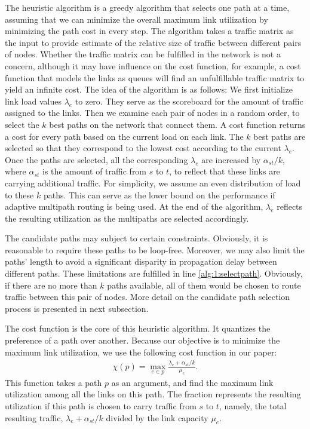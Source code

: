 \documentclass[conference]{IEEEtran}
\begin{document}
The heuristic algorithm is a greedy algorithm that selects one path at a time,
assuming that we can minimize the overall maximum link utilization by
minimizing the path cost in every step. The algorithm takes a traffic matrix as
the input to provide estimate of the relative size of traffic between different
pairs of nodes. Whether the traffic matrix can be fulfilled in the network is
not a concern, although it may have influence on the cost function, for example, a
cost function that models the links as queues will find an unfulfillable
traffic matrix to yield an infinite cost. The idea of the algorithm is as
follows: We first initialize link load values $\lambda_e$ to zero. They serve
as the scoreboard for the amount of traffic assigned to the links. Then we
examine each pair of nodes in a random order, to select the $k$ best paths on
the network that connect them. A cost function returns a cost for every path
based on the current load on each link. The $k$ best paths are selected so that
they correspond to the lowest cost according to the current $\lambda_e$. Once
the paths are selected, all the corresponding $\lambda_e$ are increased by
$\alpha_{st}/k$, where $\alpha_{st}$ is the amount of traffic from $s$ to $t$,
to reflect that these links are carrying additional traffic. For simplicity, we
assume an even distribution of load to these $k$ paths. This can serve as the
lower bound on the performance if adaptive multipath routing is being used. At
the end of the algorithm, $\lambda_e$ reflects the resulting utilization as the
multipaths are selected accordingly.

The candidate paths may subject to certain constraints. Obviously, it is
reasonable to require these paths to be loop-free. Moreover, we may also limit
the paths' length to avoid a significant disparity in propagation delay between
different paths. These limitations are fulfilled in line
\ref{alg:1:selectpath}. Obviously, if there are no more than $k$ paths
available, all of them would be chosen to route traffic between this pair of
nodes. More detail on the candidate path selection process is presented in next
subsection.

The cost function is the core of this heuristic algorithm. It quantizes the
preference of a path over another. Because our objective is to minimize the
maximum link utilization, we use the following cost function in our paper:
\begin{align}
\chi(p) = \max_{e\in p} \frac{\lambda_e + \alpha_{st}/k}{\mu_e}.
\label{maxfunction}
\end{align}
This function takes a path $p$ as an argument, and find the maximum link
utilization among all the links on this path. The fraction represents the
resulting utilization if this path is chosen to carry traffic from $s$ to $t$,
namely, the total resulting traffic, $\lambda_e+\alpha_{st}/k$ divided by the
link capacity $\mu_e$.
\end{document}
